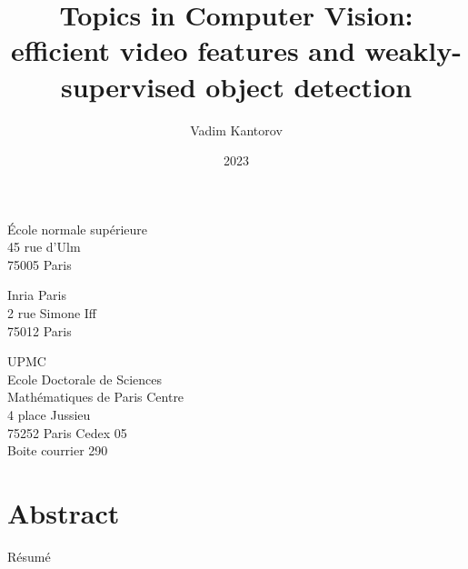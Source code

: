 \documentclass[%
	paper=A4,				%
	twoside=true,				%
	openright,				%
	parskip=full,				%
	chapterprefix=true,			%
	11pt,					%
	headings=normal,			%
	bibliography=totoc,			%
	listof=totoc,				%
	titlepage=on,				%
	captions=tableabove,			%
	draft=false,				%
]{scrreprt}%
\title{Topics in Computer Vision: efficient video features and weakly-supervised object detection}
\author{Vadim Kantorov}
\date{2023}
\begin{document}

\pagestyle{empty}				%


\begin{titlepage}

\newpage
\vspace*{\fill}
\noindent\begin{center}
\begin{minipage}[t]{(\textwidth-2cm)/3+1cm}
École normale supérieure \\
45 rue d'Ulm \\
75005 Paris
\end{minipage}
%
\hfill
%
\begin{minipage}[t]{(\textwidth-2cm)/3-1cm}
Inria Paris \\
2 rue Simone Iff \\
75012 Paris
\end{minipage}
%
\hfill
%
\begin{minipage}[t]{5.5cm}
UPMC\\
Ecole Doctorale de Sciences\\
Math\'ematiques de Paris Centre\\
4 place Jussieu\\
75252 Paris Cedex 05\\
Boite courrier 290
\end{minipage}
\end{center}
\end{titlepage}
\cleardoublepage



\pagestyle{plain}				%
\chapter*{Abstract}
\label{sec:abstract}
\vspace*{-10mm}

\newpage
{Résumé}\label{sec:abstract-fr} \\

\cleardoublepage



\end{document}
